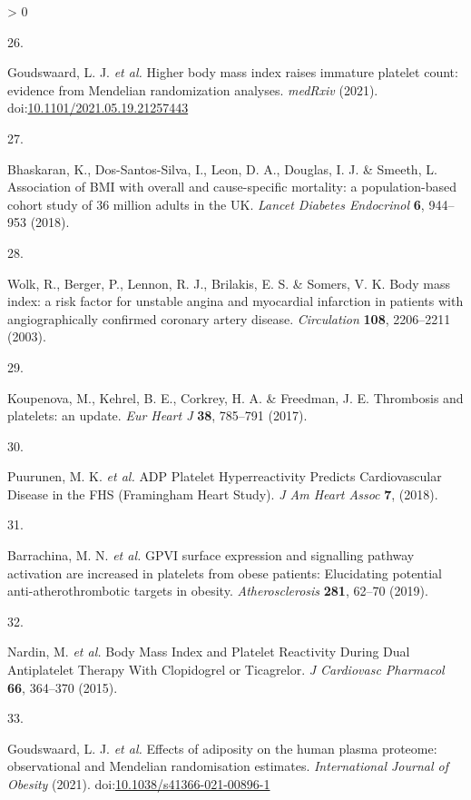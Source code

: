 \documentclass[11pt,twoside]{bristolthesis}
\newlength{\cslhangindent}
\newlength{\csllabelwidth}
\newenvironment{CSLReferences}[2] %
 {%
  \setlength{\parindent}{0pt}
  \ifodd #1 \everypar{\setlength{\hangindent}{\cslhangindent}}\ignorespaces\fi
  \ifnum #2 > 0
  \setlength{\parskip}{#2\baselineskip}
  \fi
 }%
 {}
\newcommand{\CSLLeftMargin}[1]{\parbox[t]{\csllabelwidth}{#1}}
\newcommand{\CSLRightInline}[1]{\parbox[t]{\linewidth - \csllabelwidth}{#1}\break}
\begin{document}
\begin{CSLReferences}{0}{0}
\leavevmode\hypertarget{ref-Goudswaard2021.05.19.21257443}{}%
\CSLLeftMargin{26. }
\CSLRightInline{Goudswaard, L. J. \emph{et al.} {Higher body mass index raises immature platelet count: evidence from Mendelian randomization analyses}. \emph{medRxiv} (2021). doi:\href{https://doi.org/10.1101/2021.05.19.21257443}{10.1101/2021.05.19.21257443}}

\leavevmode\hypertarget{ref-Bhaskaran2018a}{}%
\CSLLeftMargin{27. }
\CSLRightInline{Bhaskaran, K., Dos-Santos-Silva, I., Leon, D. A., Douglas, I. J. \& Smeeth, L. {Association of BMI with overall and cause-specific mortality: a population-based cohort study of 3{{}}6 million adults in the UK}. \emph{Lancet Diabetes Endocrinol} \textbf{6}, 944--953 (2018).}

\leavevmode\hypertarget{ref-Wolk2003a}{}%
\CSLLeftMargin{28. }
\CSLRightInline{Wolk, R., Berger, P., Lennon, R. J., Brilakis, E. S. \& Somers, V. K. {Body mass index: a risk factor for unstable angina and myocardial infarction in patients with angiographically confirmed coronary artery disease}. \emph{Circulation} \textbf{108}, 2206--2211 (2003).}

\leavevmode\hypertarget{ref-Koupenova2017a}{}%
\CSLLeftMargin{29. }
\CSLRightInline{Koupenova, M., Kehrel, B. E., Corkrey, H. A. \& Freedman, J. E. {Thrombosis and platelets: an update}. \emph{Eur Heart J} \textbf{38}, 785--791 (2017).}

\leavevmode\hypertarget{ref-Puurunen2018}{}%
\CSLLeftMargin{30. }
\CSLRightInline{Puurunen, M. K. \emph{et al.} {ADP Platelet Hyperreactivity Predicts Cardiovascular Disease in the FHS (Framingham Heart Study)}. \emph{J Am Heart Assoc} \textbf{7}, (2018).}

\leavevmode\hypertarget{ref-Barrachina2019}{}%
\CSLLeftMargin{31. }
\CSLRightInline{Barrachina, M. N. \emph{et al.} {GPVI surface expression and signalling pathway activation are increased in platelets from obese patients: Elucidating potential anti-atherothrombotic targets in obesity}. \emph{Atherosclerosis} \textbf{281}, 62--70 (2019).}

\leavevmode\hypertarget{ref-Nardin2015}{}%
\CSLLeftMargin{32. }
\CSLRightInline{Nardin, M. \emph{et al.} {Body Mass Index and Platelet Reactivity During Dual Antiplatelet Therapy With Clopidogrel or Ticagrelor}. \emph{J Cardiovasc Pharmacol} \textbf{66}, 364--370 (2015).}

\leavevmode\hypertarget{ref-Goudswaard2021}{}%
\CSLLeftMargin{33. }
\CSLRightInline{Goudswaard, L. J. \emph{et al.} {Effects of adiposity on the human plasma proteome: observational and Mendelian randomisation estimates}. \emph{International Journal of Obesity} (2021). doi:\href{https://doi.org/10.1038/s41366-021-00896-1}{10.1038/s41366-021-00896-1}}


\end{CSLReferences}
\end{document}

